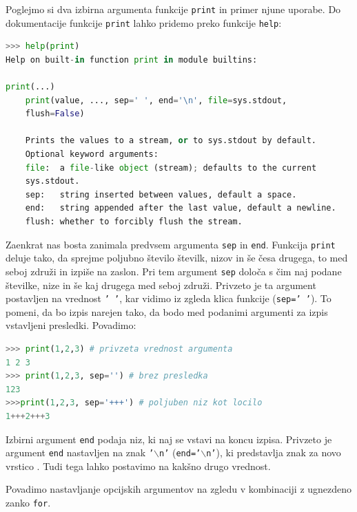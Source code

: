 Poglejmo si dva izbirna argumenta funkcije \texttt{print} in primer njune uporabe. Do dokumentacije funkcije \texttt{print} lahko pridemo preko funkcije \texttt{help}:
\begin{lstlisting}[language=Python]
>>> help(print)
Help on built-in function print in module builtins:

print(...)
    print(value, ..., sep=' ', end='\n', file=sys.stdout, 
    flush=False)
    
    Prints the values to a stream, or to sys.stdout by default.
    Optional keyword arguments:
    file:  a file-like object (stream); defaults to the current 
    sys.stdout.
    sep:   string inserted between values, default a space.
    end:   string appended after the last value, default a newline.
    flush: whether to forcibly flush the stream.
\end{lstlisting}
Zaenkrat nas bosta zanimala predvsem argumenta \texttt{sep} in \texttt{end}. Funkcija \texttt{print} deluje tako, da sprejme poljubno število številk, nizov in še česa drugega, to med seboj združi in izpiše na zaslon. Pri tem argument \texttt{sep} določa s čim naj podane številke, nize in še kaj drugega med seboj združi. Privzeto je ta argument postavljen na vrednost \texttt{' '}, kar vidimo iz zgleda klica funkcije (\texttt{sep=' '}). To pomeni, da bo izpis narejen tako, da bodo med podanimi argumenti za izpis vstavljeni presledki. Povadimo:
\begin{lstlisting}[language=Python]
>>> print(1,2,3) # privzeta vrednost argumenta
1 2 3
>>> print(1,2,3, sep='') # brez presledka
123
>>>print(1,2,3, sep='+++') # poljuben niz kot locilo
1+++2+++3
\end{lstlisting}
Izbirni argument \texttt{end} podaja niz, ki naj se vstavi na koncu izpisa. Privzeto je argument \texttt{end} nastavljen na znak \texttt{'$\backslash$n'} (\texttt{end='$\backslash$n'}), ki predstavlja znak za novo vrstico . Tudi tega lahko postavimo na kakšno drugo vrednost. 

Povadimo nastavljanje opcijskih argumentov na zgledu v kombinaciji z ugnezdeno zanko \texttt{for}.

